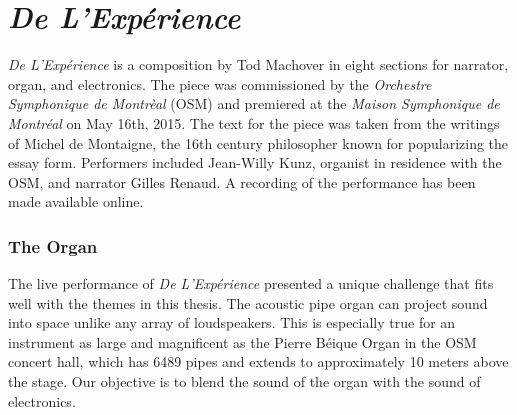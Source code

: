 \clearpage
\chapter{\textit{De L'Exp\'{e}rience}}
\label{ch:experience}

\textit{De L'Exp\'{e}rience} is a composition by Tod Machover in eight
sections for narrator, organ, and electronics. The piece was
commissioned by the \textit{Orchestre Symphonique de Montr\`{e}al}
(OSM) and premiered at the \textit{Maison Symphonique de Montr\'{e}al}
on May 16th, 2015. The text for the piece was taken from the writings
of Michel de Montaigne, the 16th century philosopher known for
popularizing the essay form.  Performers included Jean-Willy Kunz,
organist in residence with the OSM, and narrator Gilles Renaud. A
recording of the performance has been made available
online.


\subsection{The Organ}
\label{sec:organ}
The live performance of \textit{De L'Exp\'{e}rience} presented a
unique challenge that fits well with the themes in this thesis. The
acoustic pipe organ can project sound into space unlike any array of
loudspeakers. This is especially true for an instrument as large and
magnificent as the Pierre B\'{e}ique Organ in the OSM concert hall,
which has 6489 pipes and extends to approximately 10 meters above the
stage. Our objective is to blend the sound of the organ with the sound
of electronics.

